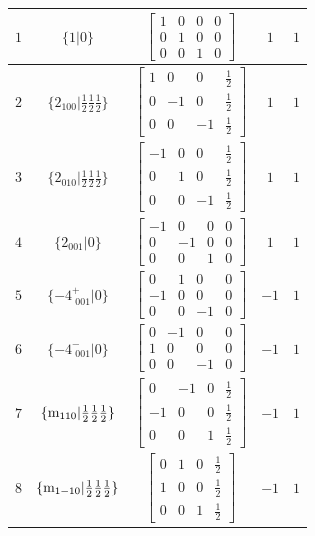 \documentclass[fleqn,8pt]{jsarticle}
\begin{document}
\begin{longtable}{ccccc}
$ 1 $ & $ \{1|0\} $ & $ \begin{bmatrix} 1 & 0 & 0 & 0 \\ 0 & 1 & 0 & 0 \\ 0 & 0 & 1 & 0 \end{bmatrix} $ & $ 1 $ & $ 1 $ \\ \hline
$ 2 $ & $ \{2{}_{100}|\frac{1}{2} \frac{1}{2} \frac{1}{2}\} $ & $ \begin{bmatrix} 1 & 0 & 0 & \frac{1}{2} \\ 0 & -1 & 0 & \frac{1}{2} \\ 0 & 0 & -1 & \frac{1}{2} \end{bmatrix} $ & $ 1 $ & $ 1 $ \\ \hline
$ 3 $ & $ \{2{}_{010}|\frac{1}{2} \frac{1}{2} \frac{1}{2}\} $ & $ \begin{bmatrix} -1 & 0 & 0 & \frac{1}{2} \\ 0 & 1 & 0 & \frac{1}{2} \\ 0 & 0 & -1 & \frac{1}{2} \end{bmatrix} $ & $ 1 $ & $ 1 $ \\ \hline
$ 4 $ & $ \{2{}_{001}|0\} $ & $ \begin{bmatrix} -1 & 0 & 0 & 0 \\ 0 & -1 & 0 & 0 \\ 0 & 0 & 1 & 0 \end{bmatrix} $ & $ 1 $ & $ 1 $ \\ \hline
$ 5 $ & $ \{-4^{+}_{\,\,001}|0\} $ & $ \begin{bmatrix} 0 & 1 & 0 & 0 \\ -1 & 0 & 0 & 0 \\ 0 & 0 & -1 & 0 \end{bmatrix} $ & $ -1 $ & $ 1 $ \\ \hline
$ 6 $ & $ \{-4^{-}_{\,\,001}|0\} $ & $ \begin{bmatrix} 0 & -1 & 0 & 0 \\ 1 & 0 & 0 & 0 \\ 0 & 0 & -1 & 0 \end{bmatrix} $ & $ -1 $ & $ 1 $ \\ \hline
$ 7 $ & $ \{{\rm m}_{110}|\frac{1}{2} \frac{1}{2} \frac{1}{2}\} $ & $ \begin{bmatrix} 0 & -1 & 0 & \frac{1}{2} \\ -1 & 0 & 0 & \frac{1}{2} \\ 0 & 0 & 1 & \frac{1}{2} \end{bmatrix} $ & $ -1 $ & $ 1 $ \\ \hline
$ 8 $ & $ \{{\rm m}_{1-10}|\frac{1}{2} \frac{1}{2} \frac{1}{2}\} $ & $ \begin{bmatrix} 0 & 1 & 0 & \frac{1}{2} \\ 1 & 0 & 0 & \frac{1}{2} \\ 0 & 0 & 1 & \frac{1}{2} \end{bmatrix} $ & $ -1 $ & $ 1 $ \\ \hline

\end{longtable}
\end{document}
